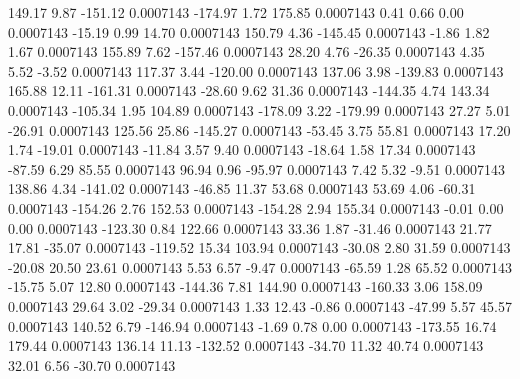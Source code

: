       149.17        9.87     -151.12     0.0007143
     -174.97        1.72      175.85     0.0007143
        0.41        0.66        0.00     0.0007143
      -15.19        0.99       14.70     0.0007143
      150.79        4.36     -145.45     0.0007143
       -1.86        1.82        1.67     0.0007143
      155.89        7.62     -157.46     0.0007143
       28.20        4.76      -26.35     0.0007143
        4.35        5.52       -3.52     0.0007143
      117.37        3.44     -120.00     0.0007143
      137.06        3.98     -139.83     0.0007143
      165.88       12.11     -161.31     0.0007143
      -28.60        9.62       31.36     0.0007143
     -144.35        4.74      143.34     0.0007143
     -105.34        1.95      104.89     0.0007143
     -178.09        3.22     -179.99     0.0007143
       27.27        5.01      -26.91     0.0007143
      125.56       25.86     -145.27     0.0007143
      -53.45        3.75       55.81     0.0007143
       17.20        1.74      -19.01     0.0007143
      -11.84        3.57        9.40     0.0007143
      -18.64        1.58       17.34     0.0007143
      -87.59        6.29       85.55     0.0007143
       96.94        0.96      -95.97     0.0007143
        7.42        5.32       -9.51     0.0007143
      138.86        4.34     -141.02     0.0007143
      -46.85       11.37       53.68     0.0007143
       53.69        4.06      -60.31     0.0007143
     -154.26        2.76      152.53     0.0007143
     -154.28        2.94      155.34     0.0007143
       -0.01        0.00        0.00     0.0007143
     -123.30        0.84      122.66     0.0007143
       33.36        1.87      -31.46     0.0007143
       21.77       17.81      -35.07     0.0007143
     -119.52       15.34      103.94     0.0007143
      -30.08        2.80       31.59     0.0007143
      -20.08       20.50       23.61     0.0007143
        5.53        6.57       -9.47     0.0007143
      -65.59        1.28       65.52     0.0007143
      -15.75        5.07       12.80     0.0007143
     -144.36        7.81      144.90     0.0007143
     -160.33        3.06      158.09     0.0007143
       29.64        3.02      -29.34     0.0007143
        1.33       12.43       -0.86     0.0007143
      -47.99        5.57       45.57     0.0007143
      140.52        6.79     -146.94     0.0007143
       -1.69        0.78        0.00     0.0007143
     -173.55       16.74      179.44     0.0007143
      136.14       11.13     -132.52     0.0007143
      -34.70       11.32       40.74     0.0007143
       32.01        6.56      -30.70     0.0007143
